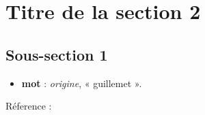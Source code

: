 
\section{Titre de la section 2}

\subsection{Sous-section 1} \label{labelLivre1}

\begin{itemize}[leftmargin=1cm, label=, itemsep=1pt]
\item {\footnotesize \bf mot} : {\it origine}, « guillemet ».
\end{itemize}



Réference : \cite{nomLivre1}

